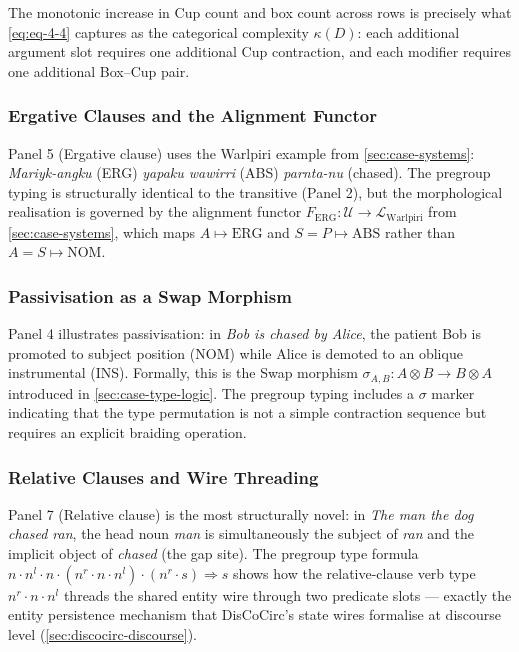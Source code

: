\documentclass[
]{article}
\begin{document}
The monotonic increase in Cup count and box count across rows is
precisely what \autoref{eq:eq-4-4} captures as the categorical
complexity \(\kappa{(D)}\): each additional argument slot requires one
additional Cup contraction, and each modifier requires one additional
Box--Cup pair.

\subsubsection{Ergative Clauses and the Alignment
Functor}\label{ergative-clauses-and-the-alignment-functor}

Panel 5 (Ergative clause) uses the Warlpiri example from
\autoref{sec:case-systems}: \emph{Mariyk-angku} (ERG) \emph{yapaku
wawirri} (ABS) \emph{parnta-nu} (chased). The pregroup typing is
structurally identical to the transitive (Panel 2), but the
morphological realisation is governed by the alignment functor
\(F_{\mathrm{ERG}}: \mathcal{U} \to \mathcal{L}_{\mathrm{Warlpiri}}\)
from \autoref{sec:case-systems}, which maps \(A \mapsto \mathrm{ERG}\)
and \(S = P \mapsto \mathrm{ABS}\) rather than
\(A = S \mapsto \mathrm{NOM}\).

\subsubsection{Passivisation as a Swap
Morphism}\label{passivisation-as-a-swap-morphism}

Panel 4 illustrates passivisation: in \emph{Bob is chased by Alice}, the
patient Bob is promoted to subject position (NOM) while Alice is demoted
to an oblique instrumental (INS). Formally, this is the Swap morphism
\(\sigma_{A,B}: A \otimes B \to B \otimes A\) introduced in
\autoref{sec:case-type-logic}. The pregroup typing includes a
\(\sigma{}\) marker indicating that the type permutation is not a simple
contraction sequence but requires an explicit braiding operation.

\subsubsection{Relative Clauses and Wire
Threading}\label{relative-clauses-and-wire-threading}

Panel 7 (Relative clause) is the most structurally novel: in \emph{The
man the dog chased ran}, the head noun \emph{man} is simultaneously the
subject of \emph{ran} and the implicit object of \emph{chased} (the gap
site). The pregroup type formula
\(n \cdot n^l \cdot n \cdot (n^r \cdot n \cdot n^l) \cdot (n^r \cdot s) \Rightarrow s\)
shows how the relative-clause verb type \(n^r \cdot n \cdot n^l\)
threads the shared entity wire through two predicate slots --- exactly
the entity persistence mechanism that DisCoCirc's state wires formalise
at discourse level (\autoref{sec:discocirc-discourse}).
\end{document}
